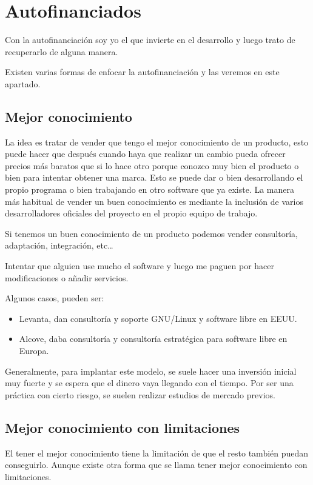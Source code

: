\section{Autofinanciados}

Con la autofinanciación soy yo el que invierte en el desarrollo y luego
trato de recuperarlo de alguna manera.

Existen varias formas de enfocar la autofinanciación y las veremos en este
apartado.

\subsection{Mejor conocimiento}

La idea es tratar de vender que tengo el mejor conocimiento de un producto, esto
puede hacer que después cuando haya que realizar un cambio pueda ofrecer precios
más baratos que si lo hace otro porque conozco muy bien el producto o bien para
intentar obtener una marca. Esto se puede dar o bien desarrollando el propio
programa o bien trabajando en otro software que ya existe.
La manera más habitual de vender un buen conocimiento es mediante la
inclusión de varios desarrolladores oficiales del proyecto en el
propio equipo de trabajo.

Si tenemos un buen conocimiento de un producto podemos vender consultoría,
adaptación, integración, etc\ldots

Intentar que alguien use mucho el software y luego me paguen por hacer
modificaciones o añadir servicios.

Algunos casos, pueden ser:
\begin{itemize}
  \item Levanta, dan consultoría y soporte GNU/Linux y software libre en EEUU.
  \item Alcove, daba consultoría y consultoría estratégica para software libre
  en Europa.
\end{itemize}

Generalmente, para implantar este modelo, se suele hacer una inversión
inicial muy fuerte y se espera que el dinero vaya llegando con el
tiempo. Por ser una práctica con cierto riesgo, se suelen realizar
estudios de mercado previos.

\subsection{Mejor conocimiento con limitaciones}

El tener el mejor conocimiento tiene la limitación de que el resto también
puedan conseguirlo. Aunque existe otra forma que se llama tener
mejor conocimiento con limitaciones.

